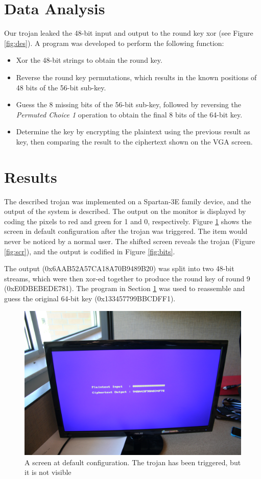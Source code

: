 \section{Data Analysis}\label{sec::analysis} 
	Our trojan leaked the 48-bit input and output to the round key xor (see Figure \ref{fig:des}). A program was developed to perform the following function: 
	\begin{itemize}
		\item Xor the 48-bit strings to obtain the round key.
		\item Reverse the round key permutations, which results in the known positions of 48 bits of the 56-bit sub-key.
		\item Guess the 8 missing bits of the 56-bit sub-key, followed by reversing the \textit{Permuted Choice 1} operation to obtain the final 8 bits of the 64-bit key. 
		\item Determine the key by encrypting the plaintext using the previous result as key, then comparing the result to the ciphertext shown on the VGA screen. 
	\end{itemize}
\section{Results}\label{sec:res}
	The described trojan was implemented on a Spartan-3E family device, and the output of the system is described. The output on the monitor is displayed by coding the pixels to red and green for 1 and 0, respectively. Figure \ref{fig:blank} shows the screen in default configuration after the trojan was triggered. The item would never be noticed by a normal user. The shifted screen reveals the trojan (Figure \ref{fig:scr}), and the output is codified in Figure \ref{fig:bits}. 

	The output (0x6AAB52A57CA18A70B9489B20) was split into two 48-bit streams, which were then xor-ed together to produce the round key of round 9 (0xE0DBEBEDE781). The program in Section \ref{sec::analysis} was used to reassemble and guess the original 64-bit key (0x133457799BBCDFF1). 
		\begin{figure}[htbp]
		\centering
		\includegraphics[scale=.05]{monitor}
		\caption{A screen at default configuration. The trojan has been triggered, but it is not visible }\label{fig:blank}
		\end{figure}

